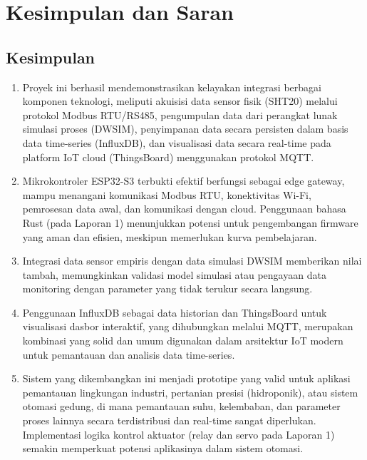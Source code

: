 \documentclass[a4paper, 12pt]{article}
\begin{document}
\section{Kesimpulan dan Saran}

\subsection{Kesimpulan}
\begin{enumerate}
    \item Proyek ini berhasil mendemonstrasikan kelayakan integrasi berbagai komponen teknologi, meliputi akuisisi data sensor fisik (SHT20) melalui protokol Modbus RTU/RS485, pengumpulan data dari perangkat lunak simulasi proses (DWSIM), penyimpanan data secara persisten dalam basis data time-series (InfluxDB), dan visualisasi data secara real-time pada platform IoT cloud (ThingsBoard) menggunakan protokol MQTT.
    
    \item Mikrokontroler ESP32-S3 terbukti efektif berfungsi sebagai edge gateway, mampu menangani komunikasi Modbus RTU, konektivitas Wi-Fi, pemrosesan data awal, dan komunikasi dengan cloud. Penggunaan bahasa Rust (pada Laporan 1) menunjukkan potensi untuk pengembangan firmware yang aman dan efisien, meskipun memerlukan kurva pembelajaran.
    
    \item Integrasi data sensor empiris dengan data simulasi DWSIM memberikan nilai tambah, memungkinkan validasi model simulasi atau pengayaan data monitoring dengan parameter yang tidak terukur secara langsung.
    
    \item Penggunaan InfluxDB sebagai data historian dan ThingsBoard untuk visualisasi dasbor interaktif, yang dihubungkan melalui MQTT, merupakan kombinasi yang solid dan umum digunakan dalam arsitektur IoT modern untuk pemantauan dan analisis data time-series.
    
    \item Sistem yang dikembangkan ini menjadi prototipe yang valid untuk aplikasi pemantauan lingkungan industri, pertanian presisi (hidroponik), atau sistem otomasi gedung, di mana pemantauan suhu, kelembaban, dan parameter proses lainnya secara terdistribusi dan real-time sangat diperlukan. Implementasi logika kontrol aktuator (relay dan servo pada Laporan 1) semakin memperkuat potensi aplikasinya dalam sistem otomasi.
\end{enumerate}
\end{document}
